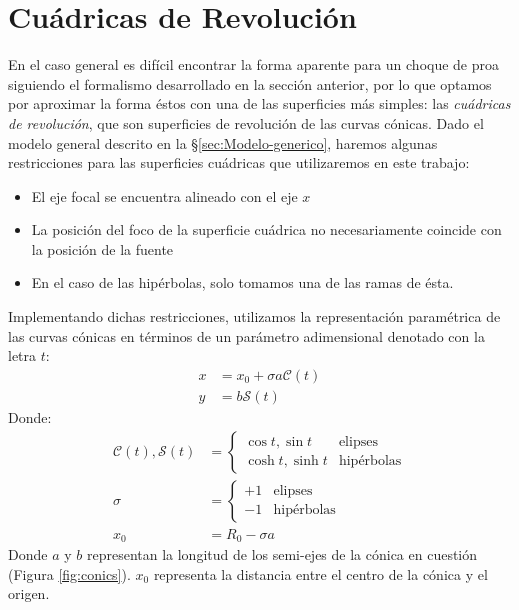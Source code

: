 \section{Cuádricas de Revolución}
\label{sec:quadrics}
\newcommand\Sin{\ensuremath{\mathcal{S}}}
\newcommand\Cos{\ensuremath{\mathcal{C}}}
\newcommand\Cot{\ensuremath{\mathcal{T}}}
\newcommand\Q{\ensuremath{\mathcal{Q}}}

En el caso general es difícil encontrar la forma aparente para un choque de
proa siguiendo el formalismo desarrollado en la sección anterior, por lo que
optamos por aproximar la forma éstos con una de las superficies más simples:
las \textit{cuádricas de revolución}, que son superficies de revolución de
las curvas cónicas. Dado el modelo general descrito en la \S \ref{sec:Modelo-generico}, haremos algunas restricciones para las superficies
cuádricas que utilizaremos en este trabajo:
\begin{itemize}
  \item El eje focal se encuentra alineado con el eje $x$
  \item La posición del foco de la superficie cuádrica no necesariamente coincide
    con la posición de la fuente
  \item En el caso de las hipérbolas, solo tomamos una de las ramas de ésta.
\end{itemize}
Implementando dichas restricciones, utilizamos la representación paramétrica de
las curvas cónicas en términos de un parámetro adimensional denotado con la letra
$t$:
\begin{align}
  x &= x_0 + \sigma a\Cos(t) \\
  y &= b\Sin(t) 
\end{align}
Donde:
\begin{align}
  \Cos(t), \Sin(t) &=\left\lbrace
  \begin{array}{lr}
    \cos{t}, \sin t & \mathrm{elipses}\\
    \cosh{t}, \sinh{t} & \mathrm{hipérbolas}       
  \end{array}\right. \\
  \sigma &= \left\lbrace
  \begin{array}{lr}
    +1 & \mathrm{elipses} \\
    -1 & \mathrm{hipérbolas}
  \end{array}\right. \\
  x_0 &= R_0 -\sigma a \label{eq:x0} 
\end{align}
Donde $a$ y $b$ representan la longitud de los semi-ejes de la cónica en cuestión (Figura \ref{fig:conics}).
$x_0$ representa la distancia entre el centro de la cónica y el origen. 

